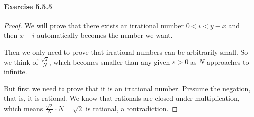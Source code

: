 \paragraph{Exercise 5.5.5} \label{exercise5.5.5}
\begin{proof}
We will prove that there exists an irrational number $0<i<y-x$ and then $x+i$ automatically becomes the number we want.

Then we only need to prove that irrational numbers can be arbitrarily small. So we think of $\frac{\sqrt{2}}{N}$, which becomes smaller than any given $\varepsilon>0$ as $N$ approaches to infinite.

But first we need to prove that it is an irrational number. Presume the negation, that is, it is rational. We know that rationals are closed under multiplication, which means $\frac{\sqrt{2}}{N} \cdot N = \sqrt{2}$ is rational, a contradiction.
\end{proof}
